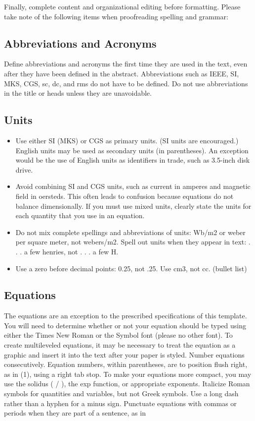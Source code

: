 \documentclass[letterpaper, 10pt, conference]{ieeeconf}   %
\begin{document}
\begin{CJK*}{UTF8}{bsmi}
Finally, complete content and organizational editing before formatting. Please take note of the following items when proofreading spelling and grammar:

\subsection{Abbreviations and Acronyms} Define abbreviations and acronyms the first time they are used in the text, even after they have been defined in the abstract. Abbreviations such as IEEE, SI, MKS, CGS, sc, dc, and rms do not have to be defined. Do not use abbreviations in the title or heads unless they are unavoidable.

\subsection{Units}

\begin{itemize}

\item Use either SI (MKS) or CGS as primary units. (SI units are encouraged.) English units may be used as secondary units (in parentheses). An exception would be the use of English units as identifiers in trade, such as 3.5-inch disk drive.
\item Avoid combining SI and CGS units, such as current in amperes and magnetic field in oersteds. This often leads to confusion because equations do not balance dimensionally. If you must use mixed units, clearly state the units for each quantity that you use in an equation.
\item Do not mix complete spellings and abbreviations of units: Wb/m2 or weber per square meter, not webers/m2.  Spell out units when they appear in text: . . . a few henries, not . . . a few H.
\item Use a zero before decimal points: 0.25, not .25. Use cm3, not cc. (bullet list)

\end{itemize}


\subsection{Equations}

The equations are an exception to the prescribed specifications of this template. You will need to determine whether or not your equation should be typed using either the Times New Roman or the Symbol font (please no other font). To create multileveled equations, it may be necessary to treat the equation as a graphic and insert it into the text after your paper is styled. Number equations consecutively. Equation numbers, within parentheses, are to position flush right, as in (1), using a right tab stop. To make your equations more compact, you may use the solidus ( / ), the exp function, or appropriate exponents. Italicize Roman symbols for quantities and variables, but not Greek symbols. Use a long dash rather than a hyphen for a minus sign. Punctuate equations with commas or periods when they are part of a sentence, as in


\end{CJK*}
\end{document}
